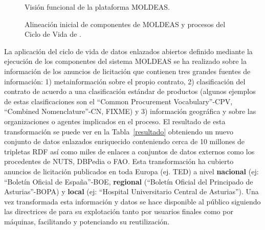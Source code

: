 \documentclass[a4paper,final,11pt,fleqn,twoside]{book}  %
\begin{document}
\begin{figure}[htb]
\centering
\caption{Visión funcional de la plataforma MOLDEAS.}\label{moldeas}
\end{figure}


\begin{figure}[h]
\centering
{}
    \caption{Alineación inicial de componentes de MOLDEAS y procesos del Ciclo de Vida de \linkeddata.}
 \label{fig:com}
\end{figure}

La aplicación del ciclo de vida de datos enlazados abiertos definido mediante la ejecución de los componentes 
del sistema MOLDEAS se ha realizado sobre la información de los anuncios de licitación que contienen tres grandes 
fuentes de información: 1) metainformación sobre el propio contrato, 2) clasificación del contrato de acuerdo a una 
clasificación estándar de productos (algunos ejemplos de estas clasificaciones son el ``Common Procurement Vocabulary''-CPV, ``Combined Nomenclature''-CN, 
FIXME) y 3) información geográfica y sobre las organizaciones o agentes implicados en el proceso. El resultado de esta transformación 
se puede ver en la Tabla~\ref{resultado} obteniendo un nuevo conjunto de datos enlazados enriquecido conteniendo cerca de 10 millones 
de tripletas RDF así como miles de enlaces a conjuntos de datos externos como los procedentes de NUTS, DBPedia o FAO. Esta transformación 
ha cubierto anuncios de licitación publicados en toda Europa (ej. TED) a nivel \textbf{nacional} (ej: ``Boletín Oficial de España''-BOE, 
\textbf{regional} (``Boletín Oficial del Principado de Asturias''-BOPA) y \textbf{local} (ej: ``Hospital Universitario Central de Asturias''). Una 
vez transformada esta información y datos se hace disponible al público siguiendo las directrices de \lod para su explotación tanto 
por usuarios finales como por máquinas, facilitando y potenciando su reutilización.
\end{document}
